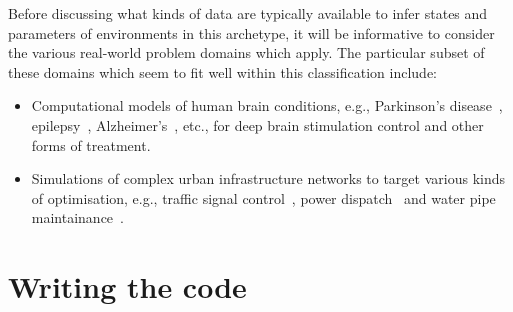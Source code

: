 Before discussing what kinds of data are typically available to infer states and parameters of environments in this archetype, it will be informative to consider the various real-world problem domains which apply. The particular subset of these domains which seem to fit well within this classification include:
\begin{itemize}
\item{Computational models of human brain conditions, e.g., Parkinson's disease~\cite{lu2019application}, epilepsy~\cite{pineau2009treating}, Alzheimer's~\cite{saboo2021reinforcement}, etc., for deep brain stimulation control and other forms of treatment.}
\item{Simulations of complex urban infrastructure networks to target various kinds of optimisation, e.g., traffic signal control~\cite{yau2017survey}, power dispatch~\cite{li2021integrating} and water pipe maintainance~\cite{bukhsh2023maintenance}.}
\end{itemize}

\section{\sffamily Writing the code}